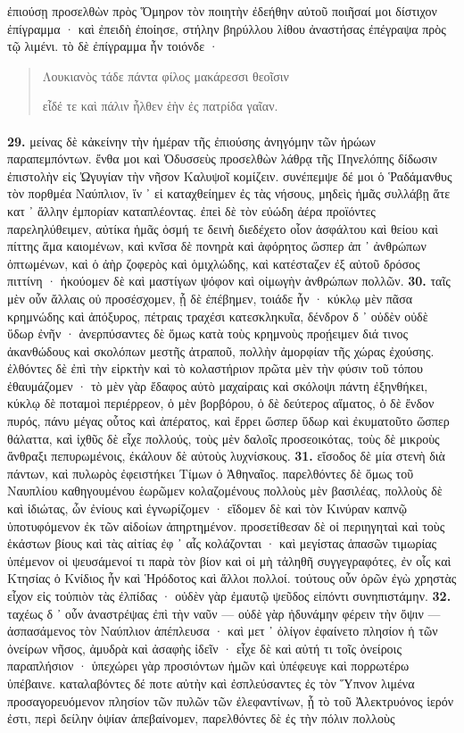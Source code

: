 \documentclass[a4paper, 11pt, oneside, polutonikogreek, german]{article}
\begin{document}
ἐπιούσῃ προσελθὼν πρὸς Ὅμηρον τὸν ποιητὴν ἐδεήθην αὐτοῦ ποιῆσαί μοι δίστιχον ἐπίγραμμα · καὶ ἐπειδὴ ἐποίησε, στήλην βηρύλλου λίθου ἀναστήσας ἐπέγραψα πρὸς τῷ λιμένι. τὸ δὲ ἐπίγραμμα ἦν τοιόνδε ·
\begin{quotation}
\footnotesize
Λουκιανὸς τάδε πάντα φίλος μακάρεσσι θεοῖσιν

εἶδέ τε καὶ πάλιν ἦλθεν ἑὴν ἐς πατρίδα γαῖαν.
\end{quotation}
\paragraph{}
\textbf{29.} μείνας δὲ κἀκείνην τὴν ἡμέραν τῆς ἐπιούσης ἀνηγόμην τῶν ἡρώων παραπεμπόντων. ἔνθα μοι καὶ Ὀδυσσεὺς προσελθὼν λάθρᾳ τῆς Πηνελόπης δίδωσιν ἐπιστολὴν εἰς Ὠγυγίαν τὴν νῆσον Καλυψοῖ κομίζειν. συνέπεμψε δέ μοι ὁ Ῥαδάμανθυς τὸν πορθμέα Ναύπλιον, ἵν ᾽ εἰ καταχθείημεν ἐς τὰς νήσους, μηδεὶς ἡμᾶς συλλάβῃ ἅτε κατ ᾽ ἄλλην ἐμπορίαν καταπλέοντας. ἐπεὶ δὲ τὸν εὐώδη ἀέρα προϊόντες παρεληλύθειμεν, αὐτίκα ἡμᾶς ὀσμή τε δεινὴ διεδέχετο οἷον ἀσφάλτου καὶ θείου καὶ πίττης ἅμα καιομένων, καὶ κνῖσα δὲ πονηρὰ καὶ ἀφόρητος ὥσπερ ἀπ ᾽ ἀνθρώπων ὀπτωμένων, καὶ ὁ ἀὴρ ζοφερὸς καὶ ὁμιχλώδης, καὶ κατέσταζεν ἐξ αὐτοῦ δρόσος πιττίνη · ἠκούομεν δὲ καὶ μαστίγων ψόφον καὶ οἰμωγὴν ἀνθρώπων πολλῶν. \textbf{30.} ταῖς μὲν οὖν ἄλλαις οὐ προσέσχομεν, ᾗ δὲ ἐπέβημεν, τοιάδε ἦν · κύκλῳ μὲν πᾶσα κρημνώδης καὶ ἀπόξυρος, πέτραις τραχέσι κατεσκληκυῖα, δένδρον δ ᾽ οὐδὲν οὐδὲ ὕδωρ ἐνῆν · ἀνερπύσαντες δὲ ὅμως κατὰ τοὺς κρημνοὺς προῄειμεν διά τινος ἀκανθώδους καὶ σκολόπων μεστῆς ἀτραποῦ, πολλὴν ἀμορφίαν τῆς χώρας ἐχούσης. ἐλθόντες δὲ ἐπὶ τὴν εἱρκτὴν καὶ τὸ κολαστήριον πρῶτα μὲν τὴν φύσιν τοῦ τόπου ἐθαυμάζομεν · τὸ μὲν γὰρ ἔδαφος αὐτὸ μαχαίραις καὶ σκόλοψι πάντη ἐξηνθήκει, κύκλῳ δὲ ποταμοὶ περιέρρεον, ὁ μὲν βορβόρου, ὁ δὲ δεύτερος αἵματος, ὁ δὲ ἔνδον πυρός, πάνυ μέγας οὗτος καὶ ἀπέρατος, καὶ ἔρρει ὥσπερ ὕδωρ καὶ ἐκυματοῦτο ὥσπερ θάλαττα, καὶ ἰχθῦς δὲ εἶχε πολλούς, τοὺς μὲν δαλοῖς προσεοικότας, τοὺς δὲ μικροὺς ἄνθραξι πεπυρωμένοις, ἐκάλουν δὲ αὐτοὺς λυχνίσκους. \textbf{31.} εἴσοδος δὲ μία στενὴ διὰ πάντων, καὶ πυλωρὸς ἐφειστήκει Τίμων ὁ Ἀθηναῖος. παρελθόντες δὲ ὅμως τοῦ Ναυπλίου καθηγουμένου ἑωρῶμεν κολαζομένους πολλοὺς μὲν βασιλέας, πολλοὺς δὲ καὶ ἰδιώτας, ὧν ἐνίους καὶ ἐγνωρίζομεν · εἴδομεν δὲ καὶ τὸν Κινύραν καπνῷ ὑποτυφόμενον ἐκ τῶν αἰδοίων ἀπηρτημένον. προσετίθεσαν δὲ οἱ περιηγηταὶ καὶ τοὺς ἑκάστων βίους καὶ τὰς αἰτίας ἐφ ᾽ αἷς κολάζονται · καὶ μεγίστας ἁπασῶν τιμωρίας ὑπέμενον οἱ ψευσάμενοί τι παρὰ τὸν βίον καὶ οἱ μὴ τἀληθῆ συγγεγραφότες, ἐν οἷς καὶ Κτησίας ὁ Κνίδιος ἦν καὶ Ἡρόδοτος καὶ ἄλλοι πολλοί. τούτους οὖν ὁρῶν ἐγὼ χρηστὰς εἶχον εἰς τοὐπιὸν τὰς ἐλπίδας · οὐδὲν γὰρ ἐμαυτῷ ψεῦδος εἰπόντι συνηπιστάμην. \textbf{32.} ταχέως δ ᾽ οὖν ἀναστρέψας ἐπὶ τὴν ναῦν --- οὐδὲ γὰρ ἠδυνάμην φέρειν τὴν ὄψιν --- ἀσπασάμενος τὸν Ναύπλιον ἀπέπλευσα · καὶ μετ ᾽ ὀλίγον ἐφαίνετο πλησίον ἡ τῶν ὀνείρων νῆσος, ἀμυδρὰ καὶ ἀσαφὴς ἰδεῖν · εἶχε δὲ καὶ αὐτή τι τοῖς ὀνείροις παραπλήσιον · ὑπεχώρει γὰρ προσιόντων ἡμῶν καὶ ὑπέφευγε καὶ πορρωτέρω ὑπέβαινε. καταλαβόντες δέ ποτε αὐτὴν καὶ ἐσπλεύσαντες ἐς τὸν Ὕπνον λιμένα προσαγορευόμενον πλησίον τῶν πυλῶν τῶν ἐλεφαντίνων, ᾗ τὸ τοῦ Ἀλεκτρυόνος ἱερόν ἐστι, περὶ δείλην ὀψίαν ἀπεβαίνομεν, παρελθόντες δὲ ἐς τὴν πόλιν πολλοὺς 
\end{document}
